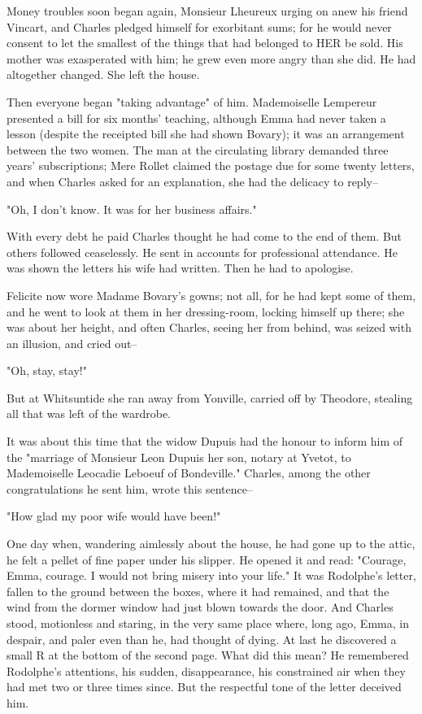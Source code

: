 \documentclass{tufte-book}
\begin{document}
Money troubles soon began again, Monsieur Lheureux urging on anew his
friend Vincart, and Charles pledged himself for exorbitant sums; for he
would never consent to let the smallest of the things that had belonged
to HER be sold. His mother was exasperated with him; he grew even more
angry than she did. He had altogether changed. She left the house.

Then everyone began "taking advantage" of him. Mademoiselle Lempereur
presented a bill for six months' teaching, although Emma had never taken
a lesson (despite the receipted bill she had shown Bovary); it was an
arrangement between the two women. The man at the circulating library
demanded three years' subscriptions; Mere Rollet claimed the postage due
for some twenty letters, and when Charles asked for an explanation, she
had the delicacy to reply--

"Oh, I don't know. It was for her business affairs."

With every debt he paid Charles thought he had come to the end of them.
But others followed ceaselessly. He sent in accounts for professional
attendance. He was shown the letters his wife had written. Then he had
to apologise.

Felicite now wore Madame Bovary's gowns; not all, for he had kept some
of them, and he went to look at them in her dressing-room, locking
himself up there; she was about her height, and often Charles, seeing
her from behind, was seized with an illusion, and cried out--

"Oh, stay, stay!"

But at Whitsuntide she ran away from Yonville, carried off by Theodore,
stealing all that was left of the wardrobe.

It was about this time that the widow Dupuis had the honour to inform
him of the "marriage of Monsieur Leon Dupuis her son, notary at Yvetot,
to Mademoiselle Leocadie Leboeuf of Bondeville." Charles, among the
other congratulations he sent him, wrote this sentence--

"How glad my poor wife would have been!"

One day when, wandering aimlessly about the house, he had gone up to the
attic, he felt a pellet of fine paper under his slipper. He opened it
and read: "Courage, Emma, courage. I would not bring misery into your
life." It was Rodolphe's letter, fallen to the ground between the boxes,
where it had remained, and that the wind from the dormer window had just
blown towards the door. And Charles stood, motionless and staring, in
the very same place where, long ago, Emma, in despair, and paler even
than he, had thought of dying. At last he discovered a small R at the
bottom of the second page. What did this mean? He remembered Rodolphe's
attentions, his sudden, disappearance, his constrained air when they
had met two or three times since. But the respectful tone of the letter
deceived him.
\end{document}
